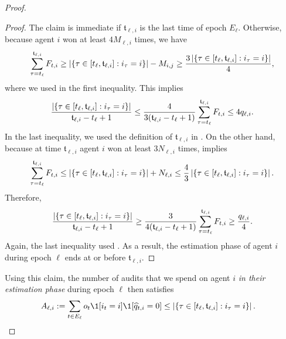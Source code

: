 \begin{proof}
\begin{proof}
The claim is immediate if ${\mathfrak t}_{\ell,i}$ is the last time of epoch $E_\ell$.
Otherwise, because agent $i$ won at least $4M_{\ell,i}$ times, we have
\begin{equation*}
    \sum_{\tau=t_\ell}^{{\mathfrak t}_{\ell,i}} F_{t,i}\geq \left|\left\{  \tau\in[t_\ell,{\mathfrak t}_{\ell,i}]: i_{\tau}=i  \right\}\right|-M_{i,j} \geq \frac{3\left|\left\{  \tau\in[t_\ell,{\mathfrak t}_{\ell,i}]: i_{\tau}=i  \right\}\right|}{4},
\end{equation*}
where we used  in the first inequality. This implies
\begin{equation*}
    \frac{ \left|\left\{  \tau\in[t_\ell,{\mathfrak t}_{\ell,i}]: i_{\tau}=i  \right\}\right| }{{\mathfrak t}_{\ell,i}-t_\ell+1} \leq \frac{4}{3({\mathfrak t}_{\ell,i}-t_\ell+1)} \sum_{\tau=t_\ell}^{{\mathfrak t}_{\ell,i}} F_{t,i} \leq 4q_{\ell,i}.
\end{equation*}
In the last inequality, we used the definition of $\mathfrak t_{\ell,i}$ in . On the other hand, because at time $\mathfrak t_{\ell,i}$ agent $i$ won at least $3N_{\ell,i}$ times,  implies
\begin{equation*}
    \sum_{\tau=t_\ell}^{{\mathfrak t}_{\ell,i}} F_{t,i} \leq \left|\left\{  \tau\in[t_\ell,{\mathfrak t}_{\ell,i}]: i_{\tau}=i  \right\}\right| + N_{\ell,i}\leq \frac{4}{3}\left|\left\{  \tau\in[t_\ell,{\mathfrak t}_{\ell,i}]: i_{\tau}=i  \right\}\right|.
\end{equation*}
Therefore,
\begin{equation*}
    \frac{ \left|\left\{  \tau\in[t_\ell,{\mathfrak t}_{\ell,i}]: i_{\tau}=i  \right\}\right| }{{\mathfrak t}_{\ell,i}-t_\ell+1} \geq \frac{3}{4({\mathfrak t}_{\ell,i}-t_\ell+1)} \sum_{\tau=t_\ell}^{{\mathfrak t}_{\ell,i}} F_{t,i} \geq \frac{q_{\ell,i}}{4}.
\end{equation*}
Again, the last inequality used . As a result, the estimation phase of agent $i$ during epoch $\ell$ ends at or before $\mathfrak t_{\ell,i}$.
\end{proof}

Using this claim, the number of audits that we spend on agent $i$ \textit{in their estimation phase} during epoch $\ell$ then satisfies
\begin{align*}
    A_{\ell,i}:=\sum_{t\in E_\ell} o_t \1[i_t=i] \1[\hat q_{t,i}=0] 
    &\leq \abs{\set{ \tau\in[t_\ell,{\mathfrak t}_{\ell,i}]: i_{\tau}=i }}.
\end{align*}


\end{proof}
